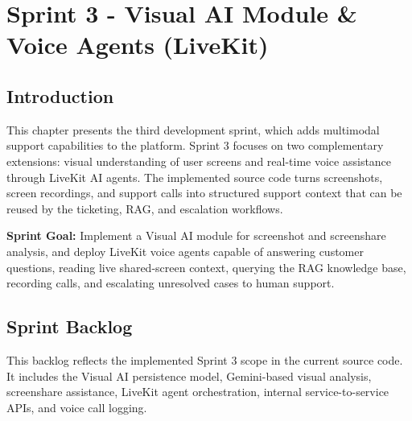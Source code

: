 \chapter{Sprint 3 - Visual AI Module \& Voice Agents (LiveKit)}
\label{chap:sprint3}

\section*{Introduction}

\noindent This chapter presents the third development sprint, which adds multimodal support capabilities to the platform. Sprint 3 focuses on two complementary extensions: visual understanding of user screens and real-time voice assistance through LiveKit AI agents. The implemented source code turns screenshots, screen recordings, and support calls into structured support context that can be reused by the ticketing, RAG, and escalation workflows.

\medskip

\textbf{Sprint Goal:} Implement a Visual AI module for screenshot and screenshare analysis, and deploy LiveKit voice agents capable of answering customer questions, reading live shared-screen context, querying the RAG knowledge base, recording calls, and escalating unresolved cases to human support.

\section{Sprint Backlog}

This backlog reflects the implemented Sprint 3 scope in the current source code. It includes the Visual AI persistence model, Gemini-based visual analysis, screenshare assistance, LiveKit agent orchestration, internal service-to-service APIs, and voice call logging.

